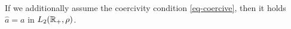 \begin{theorem}
	If we additionally assume the coercivity condition \eqref{eq-coercive}, then it holds
	$\widehat a=a$ in $L_2(\mathbb{R}_+,\rho)$.
%	
%	
\end{theorem}







